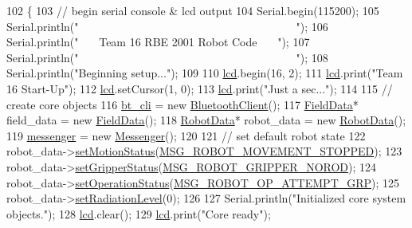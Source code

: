 \begin{DoxyCode}
102              \{
103     \textcolor{comment}{// begin serial console & lcd output}
104     Serial.begin(115200);
105     Serial.println(\textcolor{stringliteral}{"~~~~~~~~~~~~~~~~~~~~~~~~~~~~~~~~~~~~~~~"});
106     Serial.println(\textcolor{stringliteral}{"~~~   Team 16 RBE 2001 Robot Code   ~~~"});
107     Serial.println(\textcolor{stringliteral}{"~~~~~~~~~~~~~~~~~~~~~~~~~~~~~~~~~~~~~~~"});
108     Serial.println(\textcolor{stringliteral}{"Beginning setup..."});
109 
110     \hyperlink{rbe2001_8ino_a4cbb289153633c01a1584b3aa0d9a0a2}{lcd}.begin(16, 2);
111     \hyperlink{rbe2001_8ino_a4cbb289153633c01a1584b3aa0d9a0a2}{lcd}.print(\textcolor{stringliteral}{"Team 16 Start-Up"});
112     \hyperlink{rbe2001_8ino_a4cbb289153633c01a1584b3aa0d9a0a2}{lcd}.setCursor(1, 0);
113     \hyperlink{rbe2001_8ino_a4cbb289153633c01a1584b3aa0d9a0a2}{lcd}.print(\textcolor{stringliteral}{"Just a sec..."});
114 
115     \textcolor{comment}{// create core objects}
116     \hyperlink{rbe2001_8ino_ae2ff51c6b65a5b568253ca01270200bc}{bt\_cli} = \textcolor{keyword}{new} \hyperlink{class_bluetooth_client}{BluetoothClient}();
117     \hyperlink{class_field_data}{FieldData}* field\_data = \textcolor{keyword}{new} \hyperlink{class_field_data}{FieldData}();
118     \hyperlink{class_robot_data}{RobotData}* robot\_data = \textcolor{keyword}{new} \hyperlink{class_robot_data}{RobotData}();
119     \hyperlink{rbe2001_8ino_a48342badc24a04d2310ca16ff4a3711b}{messenger} = \textcolor{keyword}{new} \hyperlink{class_messenger}{Messenger}();
120 
121     \textcolor{comment}{// set default robot state}
122     robot\_data->\hyperlink{class_robot_data_a72b1b729501cd7a0620e83c5d4d9a714}{setMotionStatus}(\hyperlink{config_8h_a819fd042d57965904b3cc073fd216d7f}{MSG\_ROBOT\_MOVEMENT\_STOPPED});
123     robot\_data->\hyperlink{class_robot_data_aa115713d34966f38642357eba5543f16}{setGripperStatus}(\hyperlink{config_8h_a68ad5b89749245ea52abaa272ab0f9a9}{MSG\_ROBOT\_GRIPPER\_NOROD});
124     robot\_data->\hyperlink{class_robot_data_a2676bf89bd178c2a9a38236d936a49c0}{setOperationStatus}(\hyperlink{config_8h_aa54e5b55d86637a2f4b6112f73badfc8}{MSG\_ROBOT\_OP\_ATTEMPT\_GRP});
125     robot\_data->\hyperlink{class_robot_data_a330b0e4fa0303df4a16b8c07e917c622}{setRadiationLevel}(0);
126 
127     Serial.println(\textcolor{stringliteral}{"Initialized core system objects."});
128     \hyperlink{rbe2001_8ino_a4cbb289153633c01a1584b3aa0d9a0a2}{lcd}.clear();
129     \hyperlink{rbe2001_8ino_a4cbb289153633c01a1584b3aa0d9a0a2}{lcd}.print(\textcolor{stringliteral}{"Core ready"});

\end{DoxyCode}
